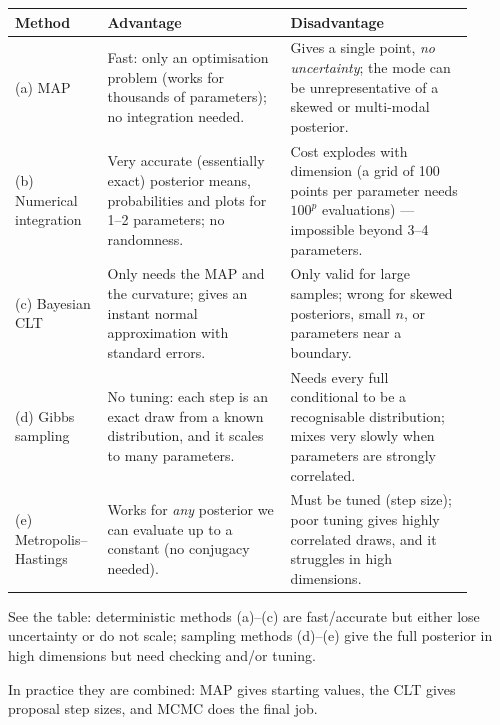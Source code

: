 \documentclass[11pt]{article}
\begin{document}
\solution
\begin{center}
\small
\renewcommand{\arraystretch}{1.35}
\begin{tabular}{p{0.17\linewidth}p{0.37\linewidth}p{0.37\linewidth}}\toprule
Method & \textbf{Advantage} & \textbf{Disadvantage}\\\midrule
(a) MAP & Fast: only an optimisation problem (works for thousands of parameters); no integration needed. & Gives a single point, \emph{no uncertainty}; the mode can be unrepresentative of a skewed or multi-modal posterior.\\
(b) Numerical integration & Very accurate (essentially exact) posterior means, probabilities and plots for 1--2 parameters; no randomness. & Cost explodes with dimension (a grid of 100 points per parameter needs $100^p$ evaluations) --- impossible beyond 3--4 parameters.\\
(c) Bayesian CLT & Only needs the MAP and the curvature; gives an instant normal approximation with standard errors. & Only valid for large samples; wrong for skewed posteriors, small $n$, or parameters near a boundary.\\
(d) Gibbs sampling & No tuning: each step is an exact draw from a known distribution, and it scales to many parameters. & Needs every full conditional to be a recognisable distribution; mixes very slowly when parameters are strongly correlated.\\
(e) Metropolis--Hastings & Works for \emph{any} posterior we can evaluate up to a constant (no conjugacy needed). & Must be tuned (step size); poor tuning gives highly correlated draws, and it struggles in high dimensions.\\\bottomrule
\end{tabular}
\end{center}

\begin{answer}
See the table: deterministic methods (a)--(c) are fast/accurate but either lose uncertainty or do not scale; sampling methods (d)--(e) give the full posterior in high dimensions but need checking and/or tuning.
\end{answer}

\begin{takeaway}
In practice they are combined: MAP gives starting values, the CLT gives proposal step sizes, and MCMC does the final job.
\end{takeaway}

\end{document}
